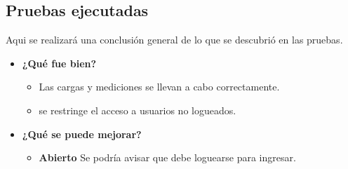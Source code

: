 \subsection{Pruebas ejecutadas}
Aqui se realizará una conclusión general de lo que se descubrió en las pruebas.
	\begin{itemize}
		\item \textbf{¿Qué fue bien?}
        	\begin{itemize}
				\item        Las cargas y mediciones se llevan a cabo correctamente.
				\item se restringe el acceso a usuarios no logueados.
			\end{itemize}
   		\item \textbf{¿Qué se puede mejorar?}
        	\begin{itemize}
		        \item \textbf{Abierto} Se podría avisar que debe loguearse para ingresar.
            \end{itemize}
        

	\end{itemize}